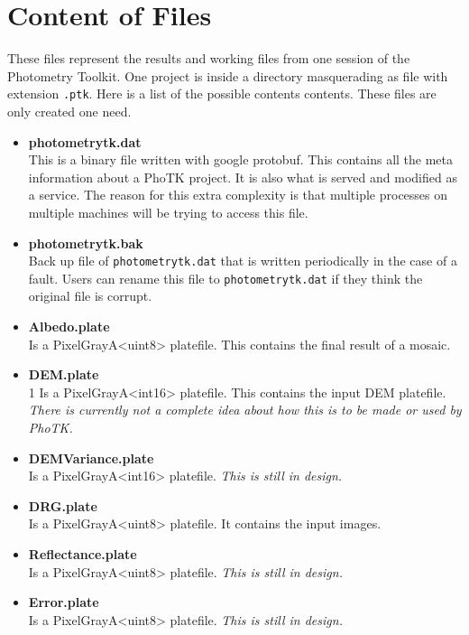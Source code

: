 \section{Content of Files}

These files represent the results and working files from one session
of the Photometry Toolkit. One project is inside a directory
masquerading as file with extension \texttt{.ptk}. Here is a list of
the possible contents contents. These files are only created one need.

\begin{itemize}
  \item \textbf{photometrytk.dat} \hfill \\
    This is a binary file written with google protobuf. This contains
    all the meta information about a PhoTK project. It is also what is
    served and modified as a service. The reason for this extra
    complexity is that multiple processes on multiple machines will be
    trying to access this file.
  \item \textbf{photometrytk.bak} \hfill \\
    Back up file of \texttt{photometrytk.dat} that is written
    periodically in the case of a fault. Users can rename this file to
    \texttt{photometrytk.dat} if they think the original file is
    corrupt.
  \item \textbf{Albedo.plate} \hfill \\
    Is a PixelGrayA<uint8> platefile. This contains the final result of
    a mosaic.
  \item \textbf{DEM.plate} \hfill \\1
    Is a PixelGrayA<int16> platefile. This contains the input DEM
    platefile. \emph{There is currently not a complete idea about how this
    is to be made or used by PhoTK.}
  \item \textbf{DEMVariance.plate} \hfill \\
    Is a PixelGrayA<int16> platefile. \emph{This is still in design.}
  \item \textbf{DRG.plate} \hfill \\
    Is a PixelGrayA<uint8> platefile. It contains the input images.
  \item \textbf{Reflectance.plate} \hfill \\
    Is a PixelGrayA<uint8> platefile. \emph{This is still in design.}
  \item \textbf{Error.plate} \hfill \\
    Is a PixelGrayA<uint8> platefile. \emph{This is still in design.}
\end{itemize}

